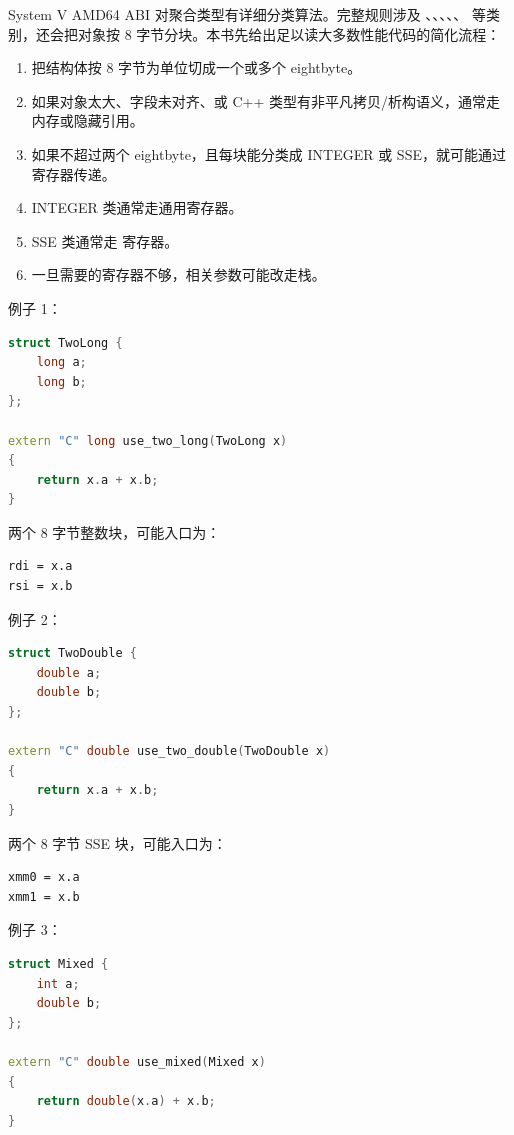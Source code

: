 System V AMD64 ABI 对聚合类型有详细分类算法。完整规则涉及 、、、、、 等类别，还会把对象按 8 字节分块。本书先给出足以读大多数性能代码的简化流程：

\begin{enumerate}
  \item 把结构体按 8 字节为单位切成一个或多个 eightbyte。
  \item 如果对象太大、字段未对齐、或 C++ 类型有非平凡拷贝/析构语义，通常走内存或隐藏引用。
  \item 如果不超过两个 eightbyte，且每块能分类成 INTEGER 或 SSE，就可能通过寄存器传递。
  \item INTEGER 类通常走通用寄存器。
  \item SSE 类通常走  寄存器。
  \item 一旦需要的寄存器不够，相关参数可能改走栈。
\end{enumerate}

例子 1：

\begin{lstlisting}[language=C++]
struct TwoLong {
    long a;
    long b;
};

extern "C" long use_two_long(TwoLong x)
{
    return x.a + x.b;
}
\end{lstlisting}

两个 8 字节整数块，可能入口为：

\begin{lstlisting}
rdi = x.a
rsi = x.b
\end{lstlisting}

例子 2：

\begin{lstlisting}[language=C++]
struct TwoDouble {
    double a;
    double b;
};

extern "C" double use_two_double(TwoDouble x)
{
    return x.a + x.b;
}
\end{lstlisting}

两个 8 字节 SSE 块，可能入口为：

\begin{lstlisting}
xmm0 = x.a
xmm1 = x.b
\end{lstlisting}

例子 3：

\begin{lstlisting}[language=C++]
struct Mixed {
    int a;
    double b;
};

extern "C" double use_mixed(Mixed x)
{
    return double(x.a) + x.b;
}
\end{lstlisting}

